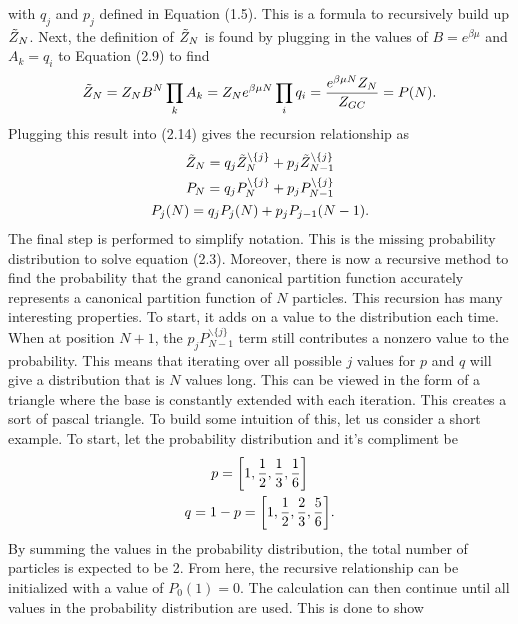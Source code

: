 with $q_j$ and $p_j$ defined in Equation (1.5). This is a formula to recursively build up $\Tilde{Z}_N$. Next, the definition of $\Tilde{Z}_N$ is found by plugging in the values of $B=e^{\beta\mu}$ and $A_k=q_i$ to Equation (2.9) to find
\begin{align}
    \Tilde{Z}_N=Z_N B^N \prod_k A_k=Z_N e^{\beta\mu N} \prod_i q_i=\frac{e^{\beta\mu N}Z_N}{Z_{GC}}=P(N).
\end{align}
Plugging this result into (2.14) gives the recursion relationship as
\begin{gather}
    \Tilde{Z}_N=q_j \Tilde{Z}_N^{\backslash\{j\}}+ p_j \Tilde{Z}_{N-1}^{\backslash\{j\}}\\
    P_N=q_j P_N^{\backslash\{j\}}+ p_j P_{N-1}^{\backslash\{j\}}\\
    P_j(N)=q_j P_j(N)+p_j P_{j-1}(N-1).
\end{gather}
The final step is performed to simplify notation. This is the missing probability distribution to solve equation (2.3). Moreover, there is now a recursive method to find the probability that the grand canonical partition function accurately represents a canonical partition function of $N$ particles. This recursion has many interesting properties. To start, it adds on a value to the distribution each time. When at position $N+1$, the $p_j P_{N-1}^{\backslash\{j\}}$ term still contributes a nonzero value to the probability. This means that iterating over all possible $j$ values for $p$ and $q$ will give a distribution that is $N$ values long. This can be viewed in the form of a triangle where the base is constantly extended with each iteration. This creates a sort of pascal triangle. To build some intuition of this, let us consider a short example. To start, let the probability distribution and it's compliment be
\begin{gather}
    p=\qty[1,\frac{1}{2},\frac{1}{3},\frac{1}{6}]\nonumber\\
    q=1-p=\qty[1,\frac{1}{2},\frac{2}{3},\frac{5}{6}]\nonumber.
\end{gather}
By summing the values in the probability distribution, the total number of particles is expected to be 2. From here, the recursive relationship can be initialized with a value of $P_0(1)=0$. The calculation can then continue until all values in the probability distribution are used. This is done to show
